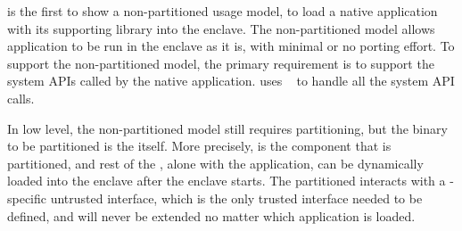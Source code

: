 \citep{baumann14haven} is the first to show a non-partitioned usage model,
to load a native application with its supporting library
into the enclave.
The non-partitioned model allows application to be run in the enclave as it is, with minimal or no porting effort.
To support the non-partitioned model, the primary requirement is to support the system APIs called by the native application.
\haven{} uses \drawbridge{} \libos{}~\citep{porter11drawbridge}
to handle all the system API calls.

In low level, the non-partitioned model still requires partitioning, but the binary to be partitioned is the \libos{} itself.
More precisely, \drawbridge{} \pal{} is the component that is partitioned,
and rest of the \libos{}, alone with the application,
can be dynamically loaded into the enclave after the enclave starts.
The partitioned \drawbridge{} \pal{} interacts with a \libos{}-specific untrusted interface,
which is the only trusted interface needed to be defined,
and will never be extended no matter which application is loaded.
